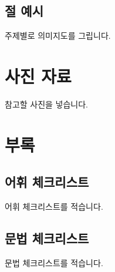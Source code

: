 \documentclass{snu-fl-questionnaire}
\begin{document}
\section{절 예시}
주제별로 의미지도를 그립니다.


\chapter{사진 자료}
참고할 사진을 넣습니다.


\chapter*{부록}
\begin{appendices}

\section{어휘 체크리스트}
어휘 체크리스트를 적습니다.


\section{문법 체크리스트}
문법 체크리스트를 적습니다.

\end{appendices}


\backmatter
\makebackcover
\end{document}
